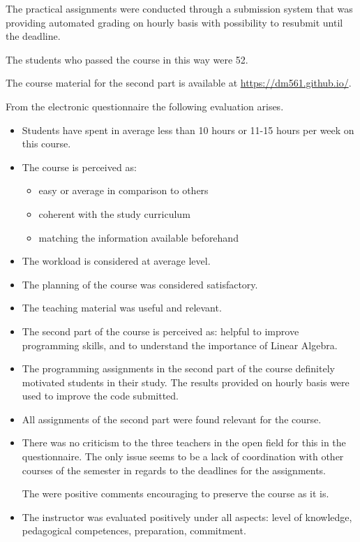 \documentclass[11pt]{article}
\begin{document}
The practical assignments were conducted through a submission system
that was providing automated grading on hourly basis with possibility
to resubmit until the deadline.

The students who passed the course in this way were 52.

The course material for the second part is available at
\url{https://dm561.github.io/}.




\medskip

From the electronic questionnaire the following evaluation arises.

\begin{itemize}
\item Students have spent in average less than 10 hours or 11-15 hours per week on this course.

\item The course is perceived as:

\begin{itemize}
\item  easy or average  in comparison to others
\item  coherent with the study curriculum
\item matching the information available beforehand
\end{itemize}

\item The workload is considered at average level.

\item The planning of the course was considered satisfactory.
\item The teaching material was useful and relevant.

\item The second part of the course is perceived as:
 helpful to improve programming skills,
and to understand the importance of Linear Algebra.

\item The programming assignments in the second part of the course
  definitely motivated students in their study. The results provided on
  hourly basis were used to improve the code submitted.

\item All assignments of the second part were found relevant for the
  course.

\item There was no criticism to the three teachers in the open field
  for this in the questionnaire. The only issue seems to be a lack of
  coordination with other courses of the semester in regards to the
  deadlines for the assignments.

  The were positive comments encouraging to preserve the course as it
  is.
  
\item The instructor was evaluated positively under all aspects: level
  of knowledge, pedagogical competences, preparation, commitment.


  
\end{itemize}
\end{document}
